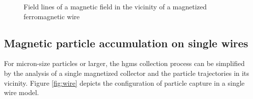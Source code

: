 \begin{figure}[H]
\centering
{}
\caption[Magnetic field in the vicinity of a wire]{Field lines of a magnetic field in the vicinity of a magnetized ferromagnetic wire\cite{FranzrebHabil}
\label{fig:mag_field_wire}
}
\end{figure}

\subsection{Magnetic particle accumulation on single wires}
\label{subsec:single_wire}
For micron-size particles or larger, the \gls{hgms} collection process can be simplified by the analysis of a single magnetized collector and the particle trajectories in its vicinity. Figure \ref{fig:wire} depicts the configuration of particle capture in a single wire model.

